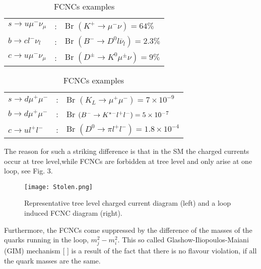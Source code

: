 \setlength{\tabcolsep}{2pt} %
\renewcommand{\arraystretch}{1} %

\begin{table}[!htb]
    \begin{minipage}{.5\linewidth}
      \caption{FCCCs examples}
\centering
\begin{tabular}{lcl}
$s \rightarrow u \mu^- \nu_\mu $ & : & Br $\left( K^+ \rightarrow \mu^- \nu\right) = 64 \%$                 \\
$b \rightarrow c l^- \nu_l $       & : & Br $\left( B^- \rightarrow D^0 l \overline{\nu}_l \right) = 2.3 \% $ \\
$c \rightarrow u \mu^- \nu_\mu $   & : & Br $\left( D^\pm \rightarrow K^0 \mu^\pm \nu \right) = 9 \%$        
\end{tabular}
    \end{minipage}%
    \begin{minipage}{.5\linewidth}
      \centering
        \caption{FCNCs examples}
\begin{tabular}{lcl}
$s \rightarrow d \mu^+ \mu^- $ & : & Br $\left( K_L \rightarrow\mu^+ \mu^- \right) =  7\times10^{-9}$        \\
$ b \rightarrow d \mu^+ \mu^-$ & : & Br $\left( B^- \rightarrow  K^{\** -} l^+ l^- \right) =  5\times10^{-7}$ \\
$ c \rightarrow u l^+ l^-$     & : & Br $\left( D^0 \rightarrow \pi l^+ l^- \right) =  1.8\times10^{-4}$      
\end{tabular}
    \end{minipage} 
\end{table}

\setlength{\tabcolsep}{6pt} %
\renewcommand{\arraystretch}{1} %

The reason for such a striking difference is that in the SM the charged currents occur at tree level,while FCNCs are forbidden at tree level and only arise at one loop, see Fig. 3.

\begin{figure}[H]
	\centering
	\texttt{[image: Stolen.png]}
	\caption{Representative tree level charged current diagram (left) and a loop induced FCNC diagram (right).}
	\label{fig:Yukawa}
\end{figure}


Furthermore, the FCNCs come suppressed by the difference of the masses of the quarks running in the loop, $m^2_j-m^2_i$. This so called Glashow-Iliopoulos-Maiani (GIM) mechanism [
] is a result of the fact that there is no flavour violation, if all the quark masses are the same.

